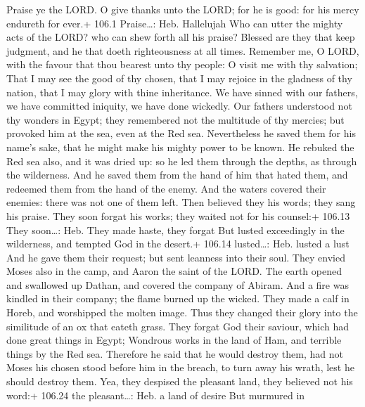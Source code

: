 Praise ye the LORD. O give thanks unto the LORD; for he is
good: for his mercy endureth for ever.+ 106.1 Praise\ldots: Heb.
Hallelujah  Who can utter the mighty acts of the LORD? who
can shew forth all his praise?  Blessed are they that keep
judgment, and he that doeth righteousness at all times. 
Remember me, O LORD, with the favour that thou bearest unto thy people:
O visit me with thy salvation;  That I may see the good of
thy chosen, that I may rejoice in the gladness of thy nation, that I may
glory with thine inheritance.  We have sinned with our
fathers, we have committed iniquity, we have done wickedly. 
Our fathers understood not thy wonders in Egypt; they remembered not the
multitude of thy mercies; but provoked him at the sea, even at the Red
sea.  Nevertheless he saved them for his name's sake, that
he might make his mighty power to be known.  He rebuked the
Red sea also, and it was dried up: so he led them through the depths, as
through the wilderness.  And he saved them from the hand of
him that hated them, and redeemed them from the hand of the enemy.
 And the waters covered their enemies: there was not one of
them left.  Then believed they his words; they sang his
praise.  They soon forgat his works; they waited not for
his counsel:+ 106.13 They soon\ldots: Heb. They made haste, they forgat
 But lusted exceedingly in the wilderness, and tempted God
in the desert.+ 106.14 lusted\ldots: Heb. lusted a lust 
And he gave them their request; but sent leanness into their soul.
 They envied Moses also in the camp, and Aaron the saint of
the LORD.  The earth opened and swallowed up Dathan, and
covered the company of Abiram.  And a fire was kindled in
their company; the flame burned up the wicked.  They made a
calf in Horeb, and worshipped the molten image.  Thus they
changed their glory into the similitude of an ox that eateth grass.
 They forgat God their saviour, which had done great things
in Egypt;  Wondrous works in the land of Ham, and terrible
things by the Red sea.  Therefore he said that he would
destroy them, had not Moses his chosen stood before him in the breach,
to turn away his wrath, lest he should destroy them.  Yea,
they despised the pleasant land, they believed not his word:+ 106.24 the
pleasant\ldots: Heb. a land of desire  But murmured in
